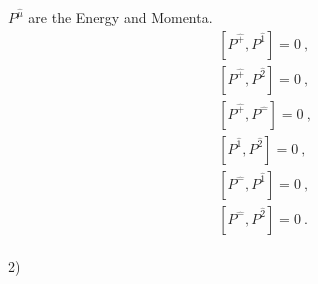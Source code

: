 \documentclass[12pt,a4paper]{report}
\begin{document}
$P^{\hat{\mu}}$ are the Energy and Momenta.
\begin{align*}
    &\left[P^{\hat{+}},P^{\hat{1}}\right]=0~,\\
    &\left[P^{\hat{+}},P^{\hat{2}}\right]=0~,\\
    &\left[P^{\hat{+}},P^{\hat{-}}\right]=0~,\\
    &\left[P^{\hat{1}},P^{\hat{2}}\right]=0~,\\
    & \left[P^{\hat{-}},P^{\hat{1}}\right]=0~,\\
    &\left[P^{\hat{-}},P^{\hat{2}}\right]=0~.
\end{align*}\\
2) 
\end{document}
